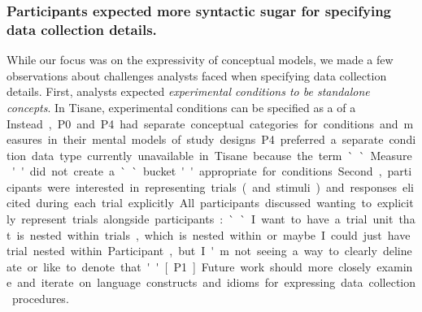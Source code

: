 \subsubsection{Participants expected more syntactic sugar for specifying data collection details.}
While our focus was on the expressivity of conceptual models, we made a few
observations about challenges analysts faced when specifying data collection
details. First, analysts expected \textit{experimental conditions to be
standalone concepts}. In Tisane, experimental conditions can be specified as a
\measure of a \unit. Instead, P0 and P4 had separate conceptual categories for
conditions and measures in their mental models of study designs. P4 preferred a
separate condition data type currently unavailable in Tisane because the term
``Measure'' did not create a ``bucket'' appropriate for conditions. Second,
participants were interested in representing trials (and stimuli) and responses
elicited during each trial explicitly. All participants discussed wanting to
explicitly represent trials alongside participants: ``I want to have a trial
unit that is nested within trials, which is nested within or maybe I could just
have trial nested within Participant, but I'm not seeing a way to clearly
delineate or like to denote that'' [P1]. Future work should more closely examine and iterate
on language constructs and idioms for expressing data collection procedures. 



